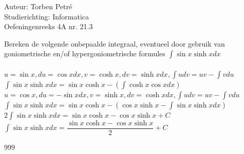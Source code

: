 \documentclass[a4paper]{article}
\begin{document}
  
\noindent \large Auteur: Torben Petré \\
\noindent \large Studierichting: Informatica\\
\noindent \large Oefeningenreeks 4A nr. 21.3\\

\medskip

\normalsize

Bereken de volgende onbepaalde integraal, eventueel door gebruik van goniometrische en/of hypergoniometrische formules $\displaystyle\int \sin x\sinh xdx$ \\\\

$u = \sin x, du = \cos xdx, v = \cosh x, dv = \sinh xdx, \displaystyle\int udv = uv - \displaystyle\int vdu$\\

$\displaystyle\int \sin x\sinh xdx = \sin x\cosh x - \left(\displaystyle\int \cosh x\cos xdx\right)$ \\

$u = \cos x, du = -\sin xdx, v = \sinh x, dv = \cosh xdx, \displaystyle\int udv = uv - \displaystyle\int vdu$\\

$\displaystyle\int \sin x\sinh xdx = \sin x\cosh x - \left(\cos x\sinh x - \displaystyle\int \sin x\sinh xdx\right)$ \\

$2 \displaystyle\int \sin x\sinh xdx = \sin x\cosh x - \cos x\sinh x + C$ \\

$\displaystyle\int \sin x\sinh xdx = \dfrac{\sin x\cosh x - \cos x\sinh x}{2} + C$ \\

\begin{thebibliography}{999}
\end{thebibliography}
\end{document}
